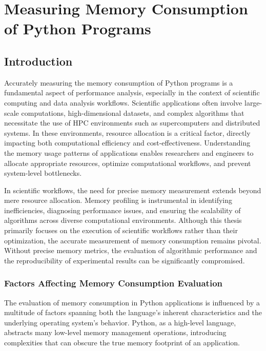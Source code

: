 \chapter{Measuring Memory Consumption of Python Programs}
\label{ch:measuring-memory-consumption}


\section{Introduction}
\label{sec:mmc-introduction}

Accurately measuring the memory consumption of Python programs is a fundamental aspect of performance analysis, especially in the context of scientific computing and data analysis workflows.
Scientific applications often involve large-scale computations, high-dimensional datasets, and complex algorithms that necessitate the use of \ac{HPC} environments such as supercomputers and distributed systems.
In these environments, resource allocation is a critical factor, directly impacting both computational efficiency and cost-effectiveness.
Understanding the memory usage patterns of applications enables researchers and engineers to allocate appropriate resources, optimize computational workflows, and prevent system-level bottlenecks.

In scientific workflows, the need for precise memory measurement extends beyond mere resource allocation.
Memory profiling is instrumental in identifying inefficiencies, diagnosing performance issues, and ensuring the scalability of algorithms across diverse computational environments.
Although this thesis primarily focuses on the execution of scientific workflows rather than their optimization, the accurate measurement of memory consumption remains pivotal.
Without precise memory metrics, the evaluation of algorithmic performance and the reproducibility of experimental results can be significantly compromised.

\subsection{Factors Affecting Memory Consumption Evaluation}
\label{subsec:mmc-factors-affecting-memory-consumption-evaluation}

The evaluation of memory consumption in Python applications is influenced by a multitude of factors spanning both the language's inherent characteristics and the underlying operating system's behavior.
Python, as a high-level language, abstracts many low-level memory management operations, introducing complexities that can obscure the true memory footprint of an application.

